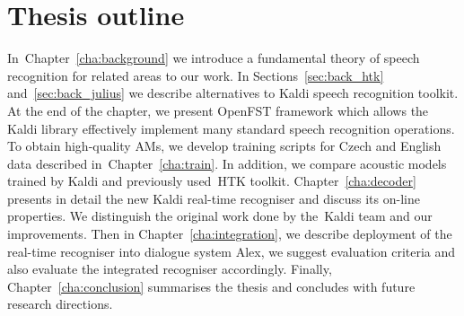 \section*{Thesis outline} 
In~Chapter~\ref{cha:background} we introduce a fundamental theory of speech recognition for related areas to our work.
In Sections~\ref{sec:back_htk} and~\ref{sec:back_julius} we describe alternatives to Kaldi speech recognition toolkit. 
At the end of the chapter, we present OpenFST framework which allows the Kaldi library effectively implement many standard speech recognition operations. 
To obtain high-quality \aclp{AM}, we develop training scripts for Czech and English data described in~Chapter~\ref{cha:train}. 
In addition, we compare acoustic models trained by Kaldi and previously used~\ac{HTK} toolkit. 
Chapter~\ref{cha:decoder} presents in detail the new Kaldi real-time recogniser and discuss its on-line properties.
We distinguish the original work done by the~Kaldi team and our improvements. 
Then in Chapter~\ref{cha:integration}, we describe deployment of the real-time recogniser into dialogue system Alex, we suggest evaluation criteria and also evaluate the integrated recogniser accordingly.
Finally, Chapter~\ref{cha:conclusion} summarises the thesis and concludes with future research directions.
